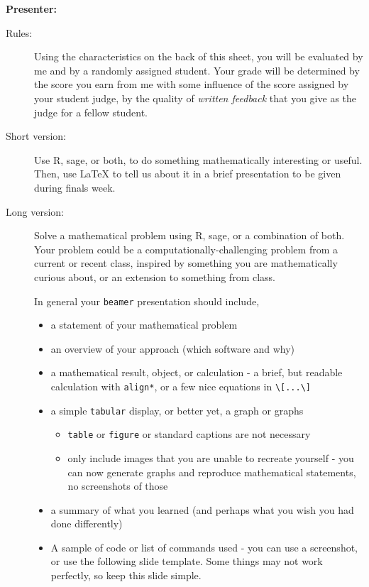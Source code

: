 \documentclass[12pt]{article}
\newcommand{\compactlist}{\setlength{\itemsep}{0pt} \setlength{\parskip}{0pt} \setlength{\leftskip}{-1em}}
\newenvironment{overbatim}{\verbatim}{\endverbatim}
\begin{document}
\hfill\textbf{Presenter: \underline{\hspace{5cm}}}

\begin{description}

\item[Rules:] Using the characteristics on the back of this sheet, you will be evaluated by me and by a randomly assigned student.  Your grade will be determined by the score you earn from me with some influence of the score assigned by your student judge, by the quality of \textit{written feedback} that you give as the judge for a fellow student.


\item[Short version:] Use R, sage, or both, to do something mathematically interesting or useful. Then, use {\LaTeX} to tell us about it in a brief presentation to be given during finals week.

\item[Long version:] Solve a mathematical problem using R, sage, or a combination of both. Your problem could be a computationally-challenging problem from a current or recent class, inspired by something you are mathematically curious about, or an extension to something from class.

\noindent In general your \verb|beamer| presentation should include,
\begin{itemize}
\item a statement of your mathematical problem
\item an overview of your approach (which software and why)
\item a mathematical result, object, or calculation - a brief, but readable calculation with \verb|align*|, or a few nice equations in \verb|\[...\]|
\item a simple \verb|tabular| display, or better yet, a graph or graphs
\begin{itemize}\compactlist
\item \verb|table| or \verb|figure| or standard captions are not necessary
\item only include images that you are unable to recreate yourself - you can now generate graphs and reproduce mathematical statements, no screenshots of those
\end{itemize}
\item a summary of what you learned (and perhaps what you wish you had done differently)
\item A sample of code or list of commands used - you can use a screenshot, or use the following slide template. Some things may not work perfectly, so keep this slide simple.
\begin{overbatim}
\begin{frame}}[fragile]
     \frametitle{sample title}
     \begin{verbatim}
     ...
     \end{verbatim}
\end{frame}
\end{overbatim}


\end{itemize}
\end{description}
\end{document}
